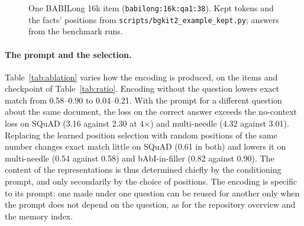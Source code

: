 \documentclass[11pt]{article}
\begin{document}
\begin{figure}[!ht]
\centering
\small
{}
\caption{One BABILong 16k item (\texttt{babilong:16k:qa1:38}). Kept tokens and the facts' positions
from \texttt{scripts/bgkit2\_example\_kept.py}; answers from the benchmark runs.}
\label{fig:example}
\end{figure}

\paragraph{The prompt and the selection.}
Table~\ref{tab:ablation} varies how the encoding is produced, on the items and checkpoint of
Table~\ref{tab:ratio}. Encoding without the question lowers exact match from 0.58--0.90 to 0.04--0.21.
With the prompt for a different question about the same document, the loss on the correct answer
exceeds the no-context loss on SQuAD (3.16 against 2.30 at 4$\times$) and multi-needle (4.32 against
3.01). Replacing the learned position selection with random positions of the same number changes
exact match little on SQuAD (0.61 in both) and lowers it on multi-needle (0.54 against 0.58) and
bAbI-in-filler (0.82 against 0.90). The content of the representations is thus determined chiefly by the
conditioning prompt, and only secondarily by the choice of positions. The encoding is specific to its prompt: one made
under one question can be reused for another only when the prompt does not depend on the question, as
for the repository overview and the memory index.
\end{document}
